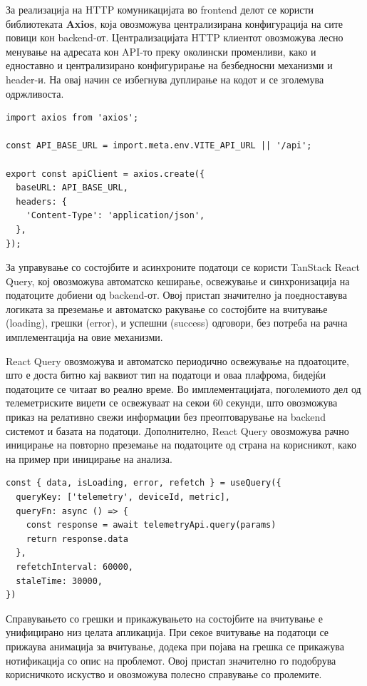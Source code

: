 За реализација на HTTP комуникацијата во frontend делот се користи библиотеката \textbf{Axios}, која овозможува централизирана конфигурација на сите повици кон backend-от. Централизацијата HTTP клиентот овозможува лесно менување на адресата кон API-то преку околински променливи, како и едноставно и централизирано конфигурирање на безбедносни механизми и header-и. На овај начин се избегнува дуплирање на кодот и се зголемува одржливоста.
\begin{verbatim}
import axios from 'axios';

const API_BASE_URL = import.meta.env.VITE_API_URL || '/api';

export const apiClient = axios.create({
  baseURL: API_BASE_URL,
  headers: {
    'Content-Type': 'application/json',
  },
});    
\end{verbatim}

За управување со состојбите и асинхроните податоци се користи TanStack React Query, кој овозможува автоматско кеширање, освежување и синхронизација на податоците добиени од backend-от. Овој пристап значително ја поедноставува логиката за преземање и автоматско ракување со состојбите на вчитување (loading), грешки (error), и успешни (success) одговори, без потреба на рачна имплементација на овие механизми.

React Query овозможува и автоматско периодично освежување на пдоатоците, што е доста битно кај ваквиот тип на податоци и оваа плафрома, бидејќи податоците се читаат во реално време. Во имплементацијата, поголемиото дел од телеметриските виџети се освежуваат на секои 60 секунди, што овозможува приказ на релативно свежи информации без преоптоварување на backend системот и базата на податоци. Дополнително, React Query овозможува рачно иницирање на повторно преземање на податоците од страна на корисникот, како на пример при иницирање на анализа.

\begin{verbatim}
const { data, isLoading, error, refetch } = useQuery({
  queryKey: ['telemetry', deviceId, metric],
  queryFn: async () => {
    const response = await telemetryApi.query(params)
    return response.data
  },
  refetchInterval: 60000,
  staleTime: 30000,
})
\end{verbatim}

Справувањето со грешки и прикажувањето на состојбите на вчитување е унифицирано низ целата апликација. При секое вчитување на податоци се прижаува анимација за вчитување, додека при појава на грешка се прикажува нотификација со опис на проблемот. Овој пристап значително го подобрува корисничкото искуство и овозможува полесно справување со пролемите.

